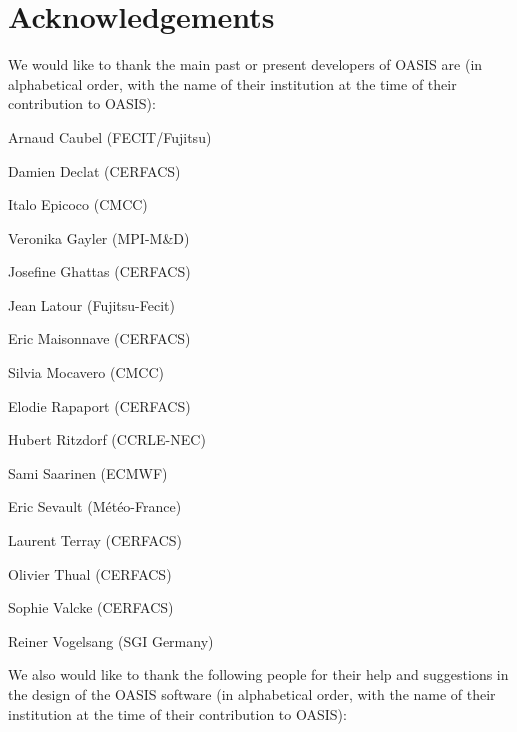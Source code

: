 \newpage


\chapter{Acknowledgements}

We would like to thank the main past or present developers of OASIS
are (in alphabetical order, with the name of their institution at the time of their contribution to OASIS):
\begin{description}
  \item Arnaud Caubel (FECIT/Fujitsu)
  \item Damien Declat (CERFACS)
  \item Italo Epicoco (CMCC)
  \item Veronika Gayler (MPI-M\&D)
  \item Josefine Ghattas (CERFACS)
  \item Jean Latour (Fujitsu-Fecit)
  \item Eric Maisonnave (CERFACS)
  \item Silvia Mocavero (CMCC)
  \item Elodie Rapaport (CERFACS)
  \item Hubert Ritzdorf (CCRLE-NEC)
  \item Sami Saarinen (ECMWF)
  \item Eric Sevault (M\'et\'eo-France)
  \item Laurent Terray (CERFACS)
  \item Olivier Thual (CERFACS)
  \item Sophie Valcke (CERFACS)
  \item Reiner Vogelsang (SGI Germany)
\end{description}

We also would like to thank the following people for their help
and suggestions in the design of the OASIS software (in alphabetical
order, with the name of their institution at the time of their contribution to OASIS):

